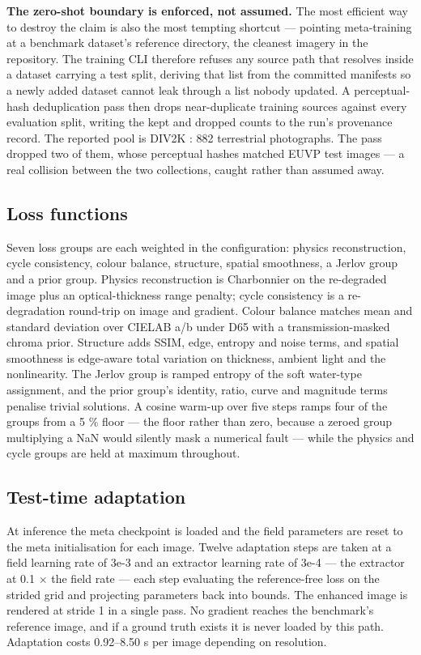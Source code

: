 \documentclass[journal]{IEEEtran}
\begin{document}
\textbf{The zero-shot boundary is enforced, not assumed.} The most efficient way to destroy the claim is also the most tempting shortcut --- pointing meta-training at a benchmark dataset's reference directory, the cleanest imagery in the repository. The training CLI therefore refuses any source path that resolves inside a dataset carrying a test split, deriving that list from the committed manifests so a newly added dataset cannot leak through a list nobody updated. A perceptual-hash deduplication pass then drops near-duplicate training sources against every evaluation split, writing the kept and dropped counts to the run's provenance record. The reported pool is DIV2K \cite{agustsson2017ntire}: 882 terrestrial photographs. The pass dropped two of them, whose perceptual hashes matched EUVP test images --- a real collision between the two collections, caught rather than assumed away.

\subsection{Loss functions}
Seven loss groups are each weighted in the configuration: physics reconstruction, cycle consistency, colour balance, structure, spatial smoothness, a Jerlov group and a prior group. Physics reconstruction is Charbonnier on the re-degraded image plus an optical-thickness range penalty; cycle consistency is a re-degradation round-trip on image and gradient. Colour balance matches mean and standard deviation over CIELAB a/b under D65 with a transmission-masked chroma prior. Structure adds SSIM, edge, entropy and noise terms, and spatial smoothness is edge-aware total variation on thickness, ambient light and the nonlinearity. The Jerlov group is ramped entropy of the soft water-type assignment, and the prior group's identity, ratio, curve and magnitude terms penalise trivial solutions. A cosine warm-up over five steps ramps four of the groups from a 5 \% floor --- the floor rather than zero, because a zeroed group multiplying a NaN would silently mask a numerical fault --- while the physics and cycle groups are held at maximum throughout.

\subsection{Test-time adaptation}
At inference the meta checkpoint is loaded and the field parameters are reset to the meta initialisation for each image. Twelve adaptation steps are taken at a field learning rate of 3e-3 and an extractor learning rate of 3e-4 --- the extractor at 0.1 $\times$ the field rate --- each step evaluating the reference-free loss on the strided grid and projecting parameters back into bounds. The enhanced image is rendered at stride 1 in a single pass. No gradient reaches the benchmark's reference image, and if a ground truth exists it is never loaded by this path. Adaptation costs 0.92--8.50 s per image depending on resolution.
\end{document}
